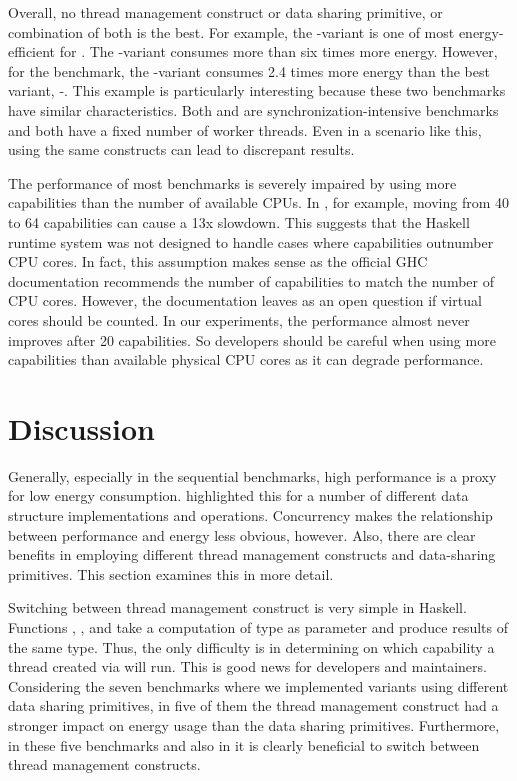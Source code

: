  Overall, no thread management construct or data sharing primitive, or combination of both is the best. For example, the \forkIO-\TMVar variant is one of most energy-efficient for \dining. The \forkOS-\TMVar variant consumes more than six times more energy. However, for the \chameneos benchmark, the \forkIO-\TMVar variant consumes 2.4 times more energy than the best variant, \forkIO-\MVar. This example is particularly interesting because these two benchmarks have similar characteristics. Both \dining and \chameneos are synchronization-intensive benchmarks and both have a fixed number of worker threads. Even in a scenario like this, using the same constructs can lead to discrepant results.
\newline

 The performance of most benchmarks is severely impaired by using more capabilities than the number of available CPUs. In \chameneos, for example, moving from 40 to 64 capabilities can cause a 13x slowdown. This suggests that the Haskell runtime system was not designed to handle cases where capabilities outnumber CPU cores. In fact, this assumption makes sense as the official GHC documentation recommends the number of capabilities to match the number of CPU cores. However, the documentation leaves as an open question if virtual cores should be counted. In our experiments, the performance almost never improves after 20 capabilities. So developers should be careful when using more capabilities than available physical CPU cores as it can degrade performance.


\section{Discussion}\label{sec:discussion}
Generally, especially in the sequential benchmarks, high performance is a proxy for low energy consumption.  highlighted this for a number of different data structure implementations and operations. Concurrency makes the relationship between performance and energy less obvious, however. Also, there are clear benefits in employing  different thread management constructs and data-sharing primitives. This section examines this in more detail.

Switching between thread management construct is very simple in Haskell. Functions \forkOn, \forkIO, and \forkOS take a computation of type \IO as parameter and produce results of the same type. Thus, the only difficulty is in determining on which capability a thread created via \forkOn will run. This is good news for developers and maintainers. Considering the seven benchmarks where we implemented variants using different data sharing primitives, in five of them the thread management construct had a stronger impact on energy usage than the data sharing primitives. Furthermore, in these five benchmarks and also in \warp it is clearly beneficial to switch between thread management constructs.

